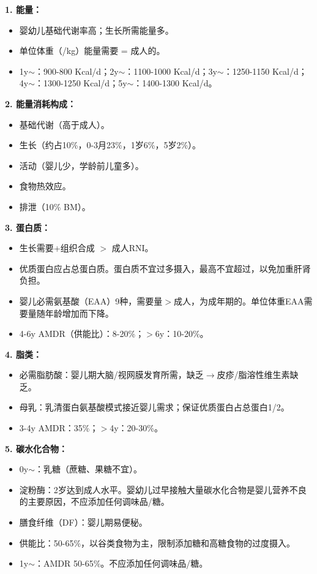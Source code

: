 \begin{keybox}
\textbf{1. 能量：}
\begin{itemize}[leftmargin=*]
    \item 婴幼儿基础代谢率高；生长所需能量多。
    \item 单位体重（/kg）能量需要 = 成人的。
    \item 1y$\sim$：900-800 Kcal/d；2y$\sim$：1100-1000 Kcal/d；3y$\sim$：1250-1150 Kcal/d；4y$\sim$：1300-1250 Kcal/d；5y$\sim$：1400-1300 Kcal/d。
\end{itemize}

\textbf{2. 能量消耗构成：}
\begin{itemize}[leftmargin=*]
    \item 基础代谢（高于成人）。
    \item 生长（约占10\%，0-3月23\%，1岁6\%，5岁2\%）。
    \item 活动（婴儿少，学龄前儿童多）。
    \item 食物热效应。
    \item 排泄（10\% BM）。
\end{itemize}

\textbf{3. 蛋白质：}
\begin{itemize}[leftmargin=*]
    \item 生长需要+组织合成 $>$ 成人RNI。
    \item 优质蛋白应占总蛋白质。蛋白质不宜过多摄入，最高不宜超过，以免加重肝肾负担。
    \item 婴儿必需氨基酸（EAA）9种，需要量$>$成人，为成年期的。单位体重EAA需要量随年龄增加而下降。
    \item 4-6y AMDR（供能比）：8-20\%；$>$6y：10-20\%。
\end{itemize}

\textbf{4. 脂类：}
\begin{itemize}[leftmargin=*]
    \item 必需脂肪酸：婴儿期大脑/视网膜发育所需，缺乏$\rightarrow$皮疹/脂溶性维生素缺乏。
    \item 母乳：乳清蛋白氨基酸模式接近婴儿需求；保证优质蛋白占总蛋白1/2。
    \item 3-4y AMDR：35\%；$>$4y：20-30\%。
\end{itemize}

\textbf{5. 碳水化合物：}
\begin{itemize}[leftmargin=*]
    \item 0y$\sim$：乳糖（蔗糖、果糖不宜）。
    \item 淀粉酶：2岁达到成人水平。婴幼儿过早接触大量碳水化合物是婴儿营养不良的主要原因，不应添加任何调味品/糖。
    \item 膳食纤维（DF）：婴儿期易便秘。
    \item 供能比：50-65\%，以谷类食物为主，限制添加糖和高糖食物的过度摄入。
    \item 1y$\sim$：AMDR 50-65\%。不应添加任何调味品/糖。
\end{itemize}


\end{keybox}

